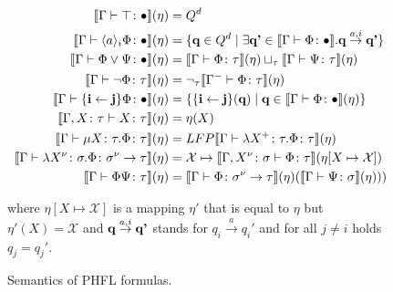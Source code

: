 \begin{figure}
    \caption{Semantics of PHFL formulas.}
    \label{figure:phfl-semantics}
    \begin{align*}
        \llbracket \Gamma \vdash \top \colon \bullet \rrbracket(\eta) &= Q^d\\
        \llbracket \Gamma \vdash \langle a \rangle_i \Phi \colon \bullet \rrbracket(\eta) &= \{\emph{q} \in Q^d \mid
        \exists \emph{q'} \in \llbracket \Gamma \vdash \Phi \colon \bullet \rrbracket . \emph{q}
        \overset{a, i}{\rightarrow} \emph{q'}\}\\
        \llbracket \Gamma \vdash \Phi \vee \Psi \colon \bullet \rrbracket(\eta) &= \llbracket \Gamma \vdash \Phi
        \colon \tau \rrbracket (\eta) \sqcup_\tau \llbracket \Gamma \vdash \Psi \colon \tau \rrbracket (\eta)\\
        \llbracket \Gamma \vdash \neg \Phi \colon \tau \rrbracket(\eta) &= \neg_\tau \llbracket \Gamma^- \vdash \Phi
        \colon \tau \rrbracket (\eta)\\
        \llbracket \Gamma \vdash \{\emph{i} \leftarrow \emph{j}\} \Phi \colon \bullet \rrbracket(\eta) &=
        \{\{\emph{i} \leftarrow \emph{j}\}(\emph{q}) \mid \emph{q} \in \llbracket \Gamma \vdash \Phi \colon \bullet
        \rrbracket (\eta)\}\\
        \llbracket \Gamma, X \colon \tau \vdash X \colon \tau \rrbracket(\eta) &= \eta(X)\\
        \llbracket \Gamma \vdash \mu X \colon \tau .\Phi \colon \tau \rrbracket(\eta) &= LFP \llbracket \Gamma \vdash
        \lambda X^+ \colon \tau . \Phi \colon \tau \rrbracket (\eta)\\
        \llbracket \Gamma \vdash \lambda X^\nu \colon \sigma. \Phi \colon \sigma^\nu \rightarrow \tau \rrbracket
        (\eta) &= \mathcal{X} \mapsto \llbracket \Gamma, X^\nu \colon \sigma \vdash \Phi \colon \tau \rrbracket
        (\eta[X \mapsto \mathcal{X}])\\
        \llbracket \Gamma \vdash \Phi \Psi \colon \tau \rrbracket(\eta) &= \llbracket \Gamma \vdash \Phi \colon \sigma
        ^\nu \rightarrow \tau \rrbracket (\eta)(\llbracket \Gamma \vdash \Psi \colon \sigma \rrbracket (\eta)))
    \end{align*}

    where $\eta[X \mapsto \mathcal{X}]$ is a mapping $\eta'$ that is equal to $\eta$ but $\eta'(X) = \mathcal{X}$ and
    $\emph{q} \overset{a, i}{\rightarrow} \emph{q'}$ stands for $q_i \overset{a}{\rightarrow} {q_i}'$ and for all $j \neq i$
    holds
    $q_j = {q_j}'$.
\end{figure}


